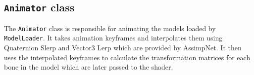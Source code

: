\subsection{\texttt{Animator} class}

The \texttt{Animator} class is responsible for animating the models loaded by \texttt{ModelLoader}.
It takes animation keyframes and interpolates them using Quaternion Slerp and Vector3 Lerp which are provided by AssimpNet.
It then uses the interpolated keyframes to calculate the transformation matrices for each bone in the model which are later passed to the shader.
